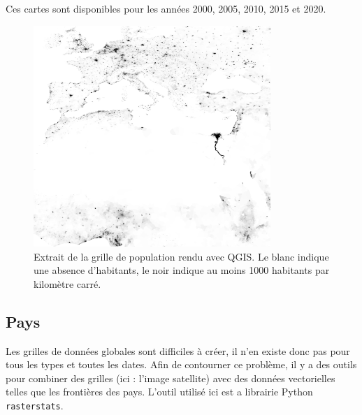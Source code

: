 \documentclass[a4paper, 11pt]{report}
\begin{document}
Ces cartes sont disponibles pour les années 2000, 2005, 2010, 2015 et 2020.

\begin{figure}[h]
	\centering
	\includegraphics[width=0.8\textwidth]{img/pop_subset.png}
	\caption{Extrait de la grille de population \cite{sedac} rendu avec QGIS. Le blanc indique une absence d'habitants, le noir indique au moins 1000 habitants par kilomètre carré.}
	\label{qgis-sedac}
\end{figure}


\subsection{Pays}
Les grilles de données globales sont difficiles à créer, il n'en existe donc pas pour tous les types et toutes les dates. Afin de contourner ce problème, il y a des outils pour combiner des grilles (ici : l'image satellite) avec des données vectorielles telles que les frontières des pays. L'outil utilisé ici est a librairie Python \texttt{rasterstats}.
\end{document}
